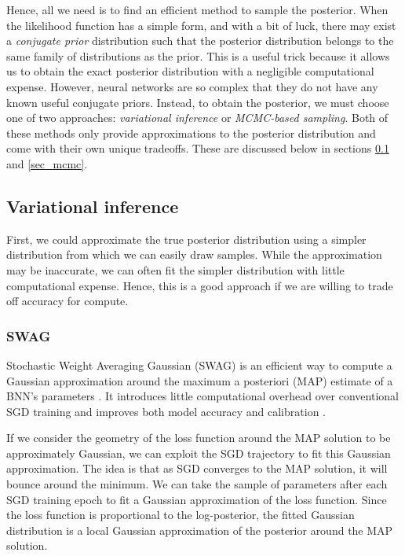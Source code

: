\documentclass[12pt]{article}
\begin{document}
Hence, all we need is to find an efficient method to sample the posterior. When the likelihood function has a simple form, and with a bit of luck, there may exist a \textit{conjugate prior} distribution such that the posterior distribution belongs to the same family of distributions as the prior. This is a useful trick because it allows us to obtain the exact posterior distribution with a negligible computational expense. However, neural networks are so complex that they do not have any known useful conjugate priors. Instead, to obtain the posterior, we must choose one of two approaches: \textit{variational inference} or \textit{MCMC-based sampling}. Both of these methods only provide approximations to the posterior distribution and come with their own unique tradeoffs. These are discussed below in sections \ref{sec_vi} and \ref{sec_mcmc}.

\subsection{Variational inference}
\label{sec_vi}

First, we could approximate the true posterior distribution using a simpler distribution from which we can easily draw samples. While the approximation may be inaccurate, we can often fit the simpler distribution with little computational expense. Hence, this is a good approach if we are willing to trade off accuracy for compute.

\subsubsection{SWAG}

Stochastic Weight Averaging Gaussian (SWAG) is an efficient way to compute a Gaussian approximation around the maximum a posteriori (MAP) estimate of a BNN's parameters \cite{swag}. It introduces little computational overhead over conventional SGD training and improves both model accuracy and calibration \cite{swag}.

If we consider the geometry of the loss function around the MAP solution to be approximately Gaussian, we can exploit the SGD trajectory to fit this Gaussian approximation. The idea is that as SGD converges to the MAP solution, it will bounce around the minimum. We can take the sample of parameters after each SGD training epoch to fit a Gaussian approximation of the loss function. Since the loss function is proportional to the log-posterior, the fitted Gaussian distribution is a local Gaussian approximation of the posterior around the MAP solution.
\end{document}
